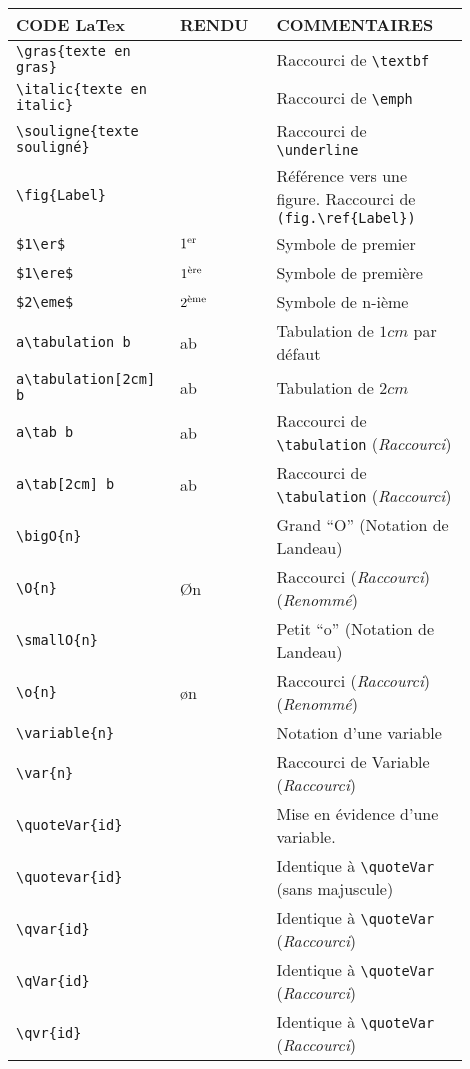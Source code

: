 \documentclass[a4paper,10pt]{article}
\newcommand{\rac}{{\color{red}(\emph{Raccourci})}}
\newcommand{\ren}{{\color{blue}(\emph{Renommé})}}
\begin{document}
		\begin{tabular}{|m{0.3\linewidth}|m{0.2\linewidth}|m{0.4\linewidth}|}
			\hline
				CODE LaTex			&	RENDU				&	COMMENTAIRES
			\\\hline\hline
				\verb!\gras{texte en gras}!	&	\gras{texte en gras}		&	Raccourci de \verb!\textbf!
			\\\hline
				\verb!\italic{texte en italic}!	&	\italic{texte en italic}		&	Raccourci de \verb!\emph!
			\\\hline
				\verb!\souligne{texte souligné}!&	\souligne{texte souligné}		&	Raccourci de \verb!\underline!
			\\\hline
				\verb!\fig{Label}!&	\fig{Label-Figure}		&	Référence vers une figure. Raccourci de \verb!(fig.\ref{Label})!
			\\\hline
				\verb!$1\er$!	&	$1\er$		&	Symbole de premier
			\\\hline
				\verb!$1\ere$!	&	$1\ere$		&	Symbole de première
			\\\hline
				\verb!$2\eme$!	&	$2\eme$		&	Symbole de n-ième
			\\\hline
				\verb!a\tabulation b!	&	a\tabulation b		&	Tabulation de $1cm$ par défaut
			\\\hline
				\verb!a\tabulation[2cm] b!	&	a\tabulation[2cm] b		&	Tabulation de $2cm$
			\\\hline
				\verb!a\tab b!	&	a\tab b		&	Raccourci de \verb!\tabulation! \rac
			\\\hline
				\verb!a\tab[2cm] b!	&	a\tab[2cm] b		&	Raccourci de \verb!\tabulation!  \rac
			\\\hline
				\verb!\bigO{n}!	&	\bigO{n}		&	Grand ``O'' (Notation de Landeau)
			\\\hline
				\verb!\O{n}!	&	\O{n}		&	Raccourci \rac\ren
			\\\hline
				\verb!\smallO{n}!	&	\smallo{n}		&	Petit ``o'' (Notation de Landeau)
			\\\hline
				\verb!\o{n}!	&	\o{n}		&	Raccourci \rac\ren
			\\\hline
				\verb!\variable{n}!	&	\variable{n}		&	Notation d'une variable
			\\\hline
				\verb!\var{n}!	&	\var{n}		&	Raccourci de Variable \rac
			\\\hline
				\verb!\quoteVar{id}!	&	\quoteVar{id}		&	Mise en évidence d'une variable.
			\\\hline
				\verb!\quotevar{id}!	&	\quoteVar{id}		&	Identique à \verb!\quoteVar! (sans majuscule)
			\\\hline
				\verb!\qvar{id}!		&	\qvar{id}		&	Identique à \verb!\quoteVar! \rac
			\\\hline
				\verb!\qVar{id}!		&	\qVar{id}		&	Identique à \verb!\quoteVar! \rac
			\\\hline
				\verb!\qvr{id}!		&	\qvr{id}		&	Identique à \verb!\quoteVar! \rac
			\\\hline
		\end{tabular}
\end{document}
